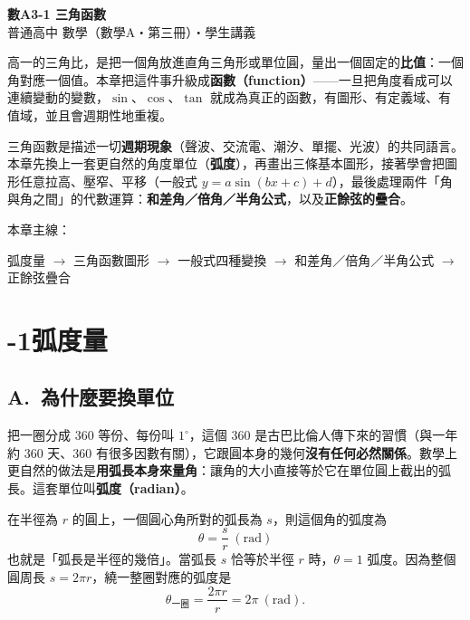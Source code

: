 \documentclass[11pt]{article}
\begin{document}
\begin{center}
{\sffamily\Huge\bfseries 數A3-1 三角函數}\\[3pt]
{\sffamily\large 普通高中 數學（數學A・第三冊）・學生講義}
\end{center}
\vspace{0.6em}

高一的三角比，是把一個角放進直角三角形或單位圓，量出一個固定的\textbf{比值}：一個角對應一個值。本章把這件事升級成\textbf{函數（function）}——一旦把角度看成可以連續變動的變數，$\sin$、$\cos$、$\tan$ 就成為真正的函數，有圖形、有定義域、有值域，並且會週期性地重複。

三角函數是描述一切\textbf{週期現象}（聲波、交流電、潮汐、單擺、光波）的共同語言。本章先換上一套更自然的角度單位（\textbf{弧度}），再畫出三條基本圖形，接著學會把圖形任意拉高、壓窄、平移（一般式 $y=a\sin(bx+c)+d$），最後處理兩件「角與角之間」的代數運算：\textbf{和差角／倍角／半角公式}，以及\textbf{正餘弦的疊合}。

\medskip
本章主線：

\begin{center}
弧度量 $\rightarrow$ 三角函數圖形 $\rightarrow$ 一般式四種變換 $\rightarrow$ 和差角／倍角／半角公式 $\rightarrow$ 正餘弦疊合
\end{center}

\section*{-1\quad 弧度量}

\subsection*{\sffamily A.\ 為什麼要換單位}

把一圈分成 $360$ 等份、每份叫 $1^\circ$，這個 $360$ 是古巴比倫人傳下來的習慣（與一年約 $360$ 天、$360$ 有很多因數有關），它跟圓本身的幾何\textbf{沒有任何必然關係}。數學上更自然的做法是\textbf{用弧長本身來量角}：讓角的大小直接等於它在單位圓上截出的弧長。這套單位叫\textbf{弧度（radian）}。

在半徑為 $r$ 的圓上，一個圓心角所對的弧長為 $s$，則這個角的弧度為
$$\boxed{\;\theta=\frac{s}{r}\;(\text{rad})\;}$$
也就是「弧長是半徑的幾倍」。當弧長 $s$ 恰等於半徑 $r$ 時，$\theta=1$ 弧度。因為整個圓周長 $s=2\pi r$，繞一整圈對應的弧度是
$$\theta_{\text{一圈}}=\frac{2\pi r}{r}=2\pi\ (\text{rad}).$$

\end{document}
